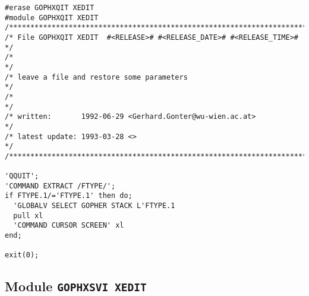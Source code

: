 \begin{verbatim}
#erase GOPHXQIT XEDIT
#module GOPHXQIT XEDIT
/***********************************************************************/
/* File GOPHXQIT XEDIT  #<RELEASE># #<RELEASE_DATE># #<RELEASE_TIME>#  */
/*                                                                     */
/* leave a file and restore some parameters                            */
/*                                                                     */
/* written:       1992-06-29 <Gerhard.Gonter@wu-wien.ac.at>            */
/* latest update: 1993-03-28 <>                                        */
/***********************************************************************/

'QQUIT';
'COMMAND EXTRACT /FTYPE/';
if FTYPE.1/='FTYPE.1' then do;
  'GLOBALV SELECT GOPHER STACK L'FTYPE.1
  pull xl
  'COMMAND CURSOR SCREEN' xl
end;

exit(0);
\end{verbatim}

\subsection{Module {\tt GOPHXSVI XEDIT}}

\def\LPtopD{Module {\tt GOPHXSVI XEDIT}}

\def\LPtopF{~}

